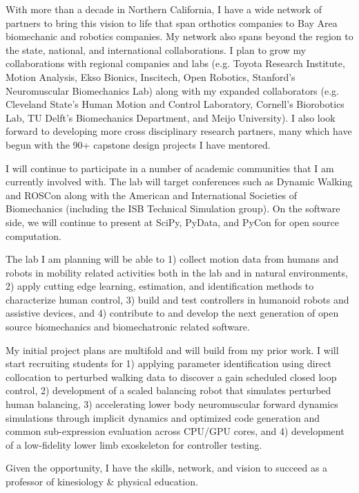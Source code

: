 \documentclass{article}
\begin{document}
With more than a decade in Northern California, I have a wide network of
partners to bring this vision to life that span orthotics companies to Bay Area
biomechanic and robotics companies. My network also spans beyond the region to
the state, national, and international collaborations. I plan to grow my
collaborations with regional companies and labs (e.g. Toyota Research
Institute, Motion Analysis, Ekso Bionics, Inscitech, Open Robotics, Stanford's
Neuromuscular Biomechanics Lab) along with my expanded collaborators (e.g.
Cleveland State's Human Motion and Control Laboratory, Cornell's Biorobotics
Lab, TU Delft's Biomechanics Department, and Meijo University). I also look
forward to developing more cross disciplinary research partners, many which
have begun with the 90+ capstone design projects I have mentored.

I will continue to participate in a number of academic communities that I am
currently involved with. The lab will target conferences such as Dynamic
Walking and ROSCon along with the American and International Societies of
Biomechanics (including the ISB Technical Simulation group). On the software
side, we will continue to present at SciPy, PyData, and PyCon for open source
computation.

The lab I am planning will be able to 1) collect motion data from humans and
robots in mobility related activities both in the lab and in natural
environments, 2) apply cutting edge learning, estimation, and identification
methods to characterize human control, 3) build and test controllers in
humanoid robots and assistive devices, and 4) contribute to and develop the
next generation of open source biomechanics and biomechatronic related
software.

My initial project plans are multifold and will build from my prior work. I
will start recruiting students for 1) applying parameter identification using
direct collocation to perturbed walking data to discover a gain scheduled
closed loop control, 2) development of a scaled balancing robot that simulates
perturbed human balancing, 3) accelerating lower body neuromuscular forward
dynamics simulations through implicit dynamics and optimized code generation
and common sub-expression evaluation across CPU/GPU cores, and 4) development
of a low-fidelity lower limb exoskeleton for controller testing.

Given the opportunity, I have the skills, network, and vision to succeed as a
professor of kinesiology \& physical education.



\end{document}
